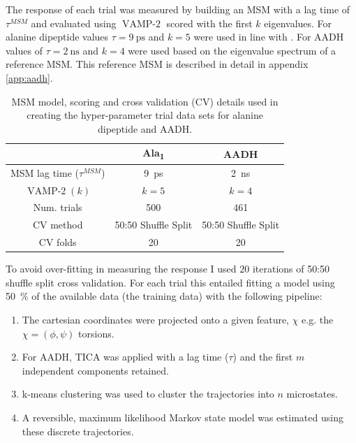 The response of each trial was measured by building an MSM with a lag time of $\tau^{MSM}$ and evaluated using $\operatorname{VAMP-2}$ scored with the first $k$ eigenvalues. For alanine dipeptide values $\tau=\SI{9}{\pico\second}$ and $k=5$ were used in line with \cite{bowmanQuantitativeComparisonAlternative2013}.  For AADH values of $\tau=\SI{2}{\nano\second}$ and $k=4$ were used based on the eigenvalue spectrum of a reference MSM. This reference MSM is described in detail in appendix \ref{app:aadh}. 


\begin{table}
    \centering
    \caption{MSM model, scoring and cross validation (CV) details  used in creating the hyper-parameter trial data sets for alanine dipeptide and AADH.}
    \begin{tabular}{|c|c|c|}
    \hline
    & Ala\textsubscript{1} & AADH \\
    \hline\hline
    MSM lag time ($\tau^{MSM}$) & \SI{9}{\pico\second} & \SI{2}{\nano\second} \\         
    $\operatorname{VAMP-2}(k)$ & $k=5$ & $k=4$ \\
    Num. trials & 500 & 461 \\
    CV method & 50:50 Shuffle Split & 50:50 Shuffle Split \\
    CV folds & 20 & 20 \\
     \hline       
    \end{tabular}
    \label{tab:trial_specs}
\end{table}

To avoid over-fitting in measuring the response I used $20$ iterations of 50:50 shuffle split cross validation. For each trial this entailed fitting a model using \SI{50}{\percent} of the available data (the training data) with the following pipeline:

\begin{enumerate}
    \item \label{lst:modfititem1} The cartesian coordinates were projected onto a given feature, $\chi$ e.g. the $\chi = (\phi, \psi)$ torsions. 
    \item \label{lst:modfititem2} For AADH, TICA was applied with a lag time ($\tau$) and the first $m$ independent components retained. 
    \item \label{lst:modfititem3} k-means clustering was used to cluster the trajectories into $n$ microstates.
    \item \label{lst:modfititem4} A reversible, maximum likelihood Markov state model was estimated using these discrete trajectories. 
\end{enumerate}

